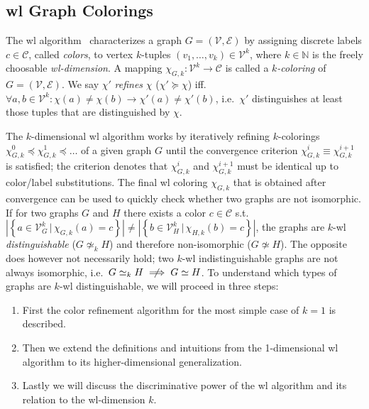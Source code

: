 \subsection{\acl{wl} Graph Colorings}%
\label{sec:related:character:wl}

The \acf{wl} algorithm~\cite{Weisfeiler1968} characterizes a graph $G = (\mathcal{V}, \mathcal{E})$ by assigning discrete labels $c \in \mathcal{C}$, called \textit{colors}, to vertex $k$-tuples $(v_1, \dots, v_k) \in \mathcal{V}^k$, where $k \in \mathbb{N}$ is the freely choosable \textit{\ac{wl}-dimension}.
A mapping $\chi_{G, k}: \mathcal{V}^k \to \mathcal{C}$ is called a \textit{$k$-coloring} of $G = (\mathcal{V}, \mathcal{E})$.
We say  $\chi'$ \textit{refines} $\chi$ ($\chi' \succeq \chi$) iff.\ $\forall a, b \in \mathcal{V}^k: \chi(a) \neq \chi(b) \rightarrow \chi'(a) \neq \chi'(b)$, i.e.\ $\chi'$ distinguishes at least those tuples that are distinguished by $\chi$.

The $k$-dimensional \ac{wl} algorithm works by iteratively refining $k$-colorings $\chi_{G, k}^0 \preceq \chi_{G, k}^1 \preceq \dots$ of a given graph $G$ until the convergence criterion $\chi_{G, k}^i \equiv \chi_{G, k}^{i+1}$ is satisfied;
the criterion denotes that $\chi_{G, k}^i$ and $\chi_{G, k}^{i+1}$ must be identical up to color/label substitutions.
The final \ac{wl} coloring $\chi_{G, k}$ that is obtained after convergence can be used to quickly check whether two graphs are not isomorphic.
If for two graphs $G$ and $H$ there exists a color $c \in \mathcal{C}$ s.t.\ $\left|\left\{ a \in \mathcal{V}_G^k\, |\, \chi_{G, k}(a) = c \right\}\right|\neq \left|\left\{ b \in \mathcal{V}_H^k\, |\, \chi_{H, k}(b) = c \right\}\right|$, the graphs are $k$-\acs{wl} \textit{distinguishable} ($G \mathrel{{\not\simeq}_k} H$) and therefore non-isomorphic ($G \not\simeq H$). %
The opposite does however not necessarily hold;
two $k$-\acs{wl} indistinguishable graphs are not always isomorphic, i.e.\ $G \mathrel{{\simeq}_k} H \centernot\implies G \simeq H$.
To understand which types of graphs are $k$-\acs{wl} distinguishable, we will proceed in three steps:
\begin{enumerate}
	\item First the color refinement algorithm for the most simple case of $k = 1$ is described.
	\item Then we extend the definitions and intuitions from the 1-dimensional \ac{wl} algorithm to its higher-dimensional generalization.
	\item Lastly we will discuss the discriminative power of the \acs{wl} algorithm and its relation to the \acs{wl}-dimension $k$.
\end{enumerate}

